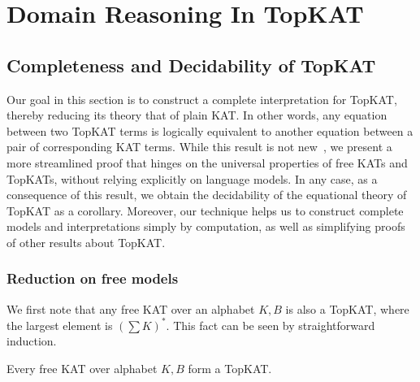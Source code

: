 \chapter{Domain Reasoning In TopKAT}
\label{chapter:TopKAT}
\thispagestyle{myheadings}

\graphicspath{{3_Details/Figures/}}



\section{Completeness and Decidability of TopKAT}
\label{sec: general completeness}

Our goal in this section is to construct a complete interpretation for TopKAT,
thereby reducing its theory that of plain KAT.  In other words, any equation
between two TopKAT terms is logically equivalent to another equation between a
pair of corresponding KAT terms.  While this result is not
new~\cite{Zhang_de_Amorim_Gaboardi_2022, Zhang_de_Amorim_Gaboardi_2022_POPL,
  Pous_Wagemaker_2022}, we present a more streamlined proof that hinges on the
universal properties of free KATs and TopKATs, without relying explicitly on
language models.  In any case, as a consequence of this result, we obtain the
decidability of the equational theory of TopKAT as a corollary.  Moreover, our
technique helps us to construct complete models and interpretations simply by
computation, as well as simplifying proofs of other results about TopKAT.


\subsection{Reduction on free models}\label{sec: reduction on free models}

We first note that any free KAT over an alphabet \(K, B\) is also a TopKAT,
where the largest element is \((∑ K)^*\). This fact can be seen by
straightforward induction.
\begin{lemma}\label{the: every free KAT is a TopKAT}
    Every free KAT over alphabet \(K, B\) form a TopKAT.
\end{lemma}

